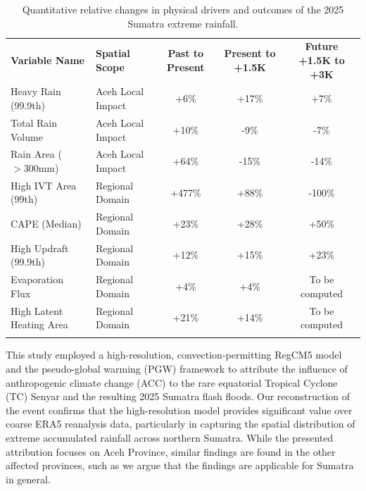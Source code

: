 \documentclass[journal abbreviation, manuscript]{copernicus}
\begin{document}
\begin{table}[t]
\caption{Quantitative relative changes in physical drivers and outcomes of the 2025 Sumatra extreme rainfall.}
\label{tab:change_schematic_summary}
\begin{tabular}{l l ccc}
\tophline
\textbf{Variable Name} & \textbf{Spatial Scope} & \textbf{Past to Present} & \textbf{Present to +1.5K} & \textbf{Future +1.5K to +3K} \\
\middlehline
Heavy Rain (99.9th) & Aceh Local Impact & +6\% & +17\% & +7\% \\
Total Rain Volume & Aceh Local Impact & +10\% & -9\% & -7\%  \\
Rain Area ($>300$mm) & Aceh Local Impact & +64\% & -15\% & -14\%  \\
High IVT Area (99th) & Regional Domain & +477\% & +88\% & -100\% \\
CAPE (Median) & Regional Domain & +23\% & +28\% & +50\% \\
High Updraft (99.9th) & Regional Domain & +12\% & +15\% & +23\% \\
Evaporation Flux & Regional Domain & +4\% & +4\% & To be computed \\
High Latent Heating Area & Regional Domain & +21\% & +14\% & To be computed \\
\bottomhline
\end{tabular}
\belowtable{}
\end{table}

This study employed a high-resolution, convection-permitting RegCM5 model and the pseudo-global warming (PGW) framework to attribute the influence of anthropogenic climate change (ACC) to the rare equatorial Tropical Cyclone (TC) Senyar and the resulting 2025 Sumatra flash floods. Our reconstruction of the event confirms that the high-resolution model provides significant value over coarse ERA5 reanalysis data, particularly in capturing the spatial distribution of extreme accumulated rainfall across northern Sumatra. While the presented attribution focuses on Aceh Province, similar findings are found in the other affected provinces, such as we argue that the findings are applicable for Sumatra in general.
\end{document}
